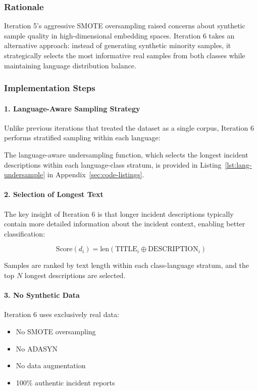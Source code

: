\documentclass[11pt, titlepage, bibliography=totoc]{scrreprt}
\begin{document}
\subsubsection{Rationale}
Iteration 5's aggressive SMOTE oversampling raised concerns about synthetic sample quality in high-dimensional embedding spaces. Iteration 6 takes an alternative approach: instead of generating synthetic minority samples, it strategically selects the most informative real samples from both classes while maintaining language distribution balance.

\subsubsection{Implementation Steps}

\paragraph{1. Language-Aware Sampling Strategy}
Unlike previous iterations that treated the dataset as a single corpus, Iteration 6 performs stratified sampling within each language:

The language-aware undersampling function, which selects the longest incident descriptions within each language-class stratum, is provided in Listing~\ref{lst:lang-undersample} in Appendix~\ref{sec:code-listings}.

\paragraph{2. Selection of Longest Text}
The key insight of Iteration 6 is that longer incident descriptions typically contain more detailed information about the incident context, enabling better classification:

\begin{equation}
\text{Score}(d_i) = \text{len}(\text{TITLE}_i \oplus \text{DESCRIPTION}_i)
\end{equation}

Samples are ranked by text length within each class-language stratum, and the top $N$ longest descriptions are selected.

\paragraph{3. No Synthetic Data}
Iteration 6 uses exclusively real data:

\begin{itemize}
    \item No SMOTE oversampling
    \item No ADASYN
    \item No data augmentation
    \item 100\% authentic incident reports
\end{itemize}
\end{document}

